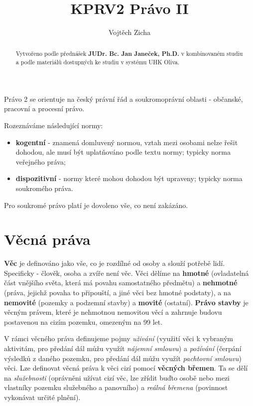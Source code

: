 \documentclass[twoside,12pt]{article}
\title{KPRV2 Právo II}
\author{Vojtěch Zicha}
\begin{document}
\maketitle\thispagestyle{mypagestyle}

\begin{abstract}
Vytvořeno podle přednášek \textbf{JUDr. Bc. Jan Janeček, Ph.D.} v kombinovaném studiu a podle materiálů dostupných ke studiu v systému UHK Oliva.
\end{abstract}

Právo 2 se orientuje na český právní řád a soukromoprávní oblasti - občanské, pracovní a procesní právo.

Rozeznáváme následující normy:

\begin{itemize}
\item \textbf{kogentní} - znamená domluvený normou, vztah mezi osobami nelze řešit dohodou, ale musí být uplatňováno podle textu normy; typicky norma veřejného práva;
\item \textbf{dispozitivní} - normy které mohou dohodou být upraveny; typicky norma soukromého práva.
\end{itemize}

Pro soukromé právo platí je dovoleno vše, co není zakázáno.

\tableofcontents

\clearpage
\section{Věcná práva}

\textbf{Věc} je definováno jako vše, co je rozdílné od osoby a slouží potřebě lidí. Specificky - člověk, osoba a zvíře není věc. Věci dělíme na \textbf{hmotné} (ovladatelná část vnějšího světa, která má povahu samostatného předmětu) a \textbf{nehmotné} (práva, jejichž povaha to připouští, a jiné věci bez hmotné podstaty), a na \textbf{nemovité} (pozemky a podzemní stavby) a \textbf{movité} (ostatní). \textbf{Právo stavby} je věcným právem, které je nehmotnou nemovitou věcí a zahrnuje budovu postavenou na cizím pozemku, omezeným na 99 let.

V rámci věcného práva definujeme pojmy \textit{uživání} (využití věci k vybraným aktivitám, pro předání dál můžu využít \textit{nájemní smlouvu}) a \textit{požívání} (čerpání výsledků z daného pozemku, pro předání dál můžu využít \textit{pachtovní smlouvu}) věci. Lze definovat věcná práva k věci cizí pomocí \textbf{věcných břemen}. Ta se dělí na \textit{služebnosti} (oprávněni užívat cizí věc, lze zřídit buďto osobě nebo mezi vlastníky pozemku služebného a panovního) a \textit{reálná břemena} (povinnost vykonávat určité plnění).
\end{document}
